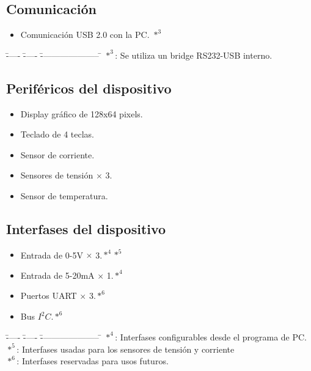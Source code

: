 \documentclass[12pt]{article}
\begin{document}
    \subsection{Comunicación}
      
      \begin{itemize}
	\item Comunicación USB 2.0 con la PC. $*^{3}$
      \end{itemize}
    
      \begin{tabbing}
	\= ----- \= ----- \= --------------------- \= \kill
	\>$*^{3}$: \>Se utiliza un bridge RS232-USB interno. \\
       \end{tabbing}
	
    \subsection{Periféricos del dispositivo}
      \begin{itemize}
	\item Display gráfico de 128x64 pixels.
	\item Teclado de 4 teclas.
	\item Sensor de corriente.
	\item Sensores de tensión $\times$ 3.
	\item Sensor de temperatura.
      \end{itemize}

    \subsection{Interfases del dispositivo}
      \begin{itemize}
	\item Entrada de 0-5V $\times$ 3.$*^{4}*^{5}$
	\item Entrada de 5-20mA $\times$ 1.$*^{4}$
	\item Puertos UART $\times$ 3.$*^{6}$
	\item Bus $ I^{2}C $.$*^{6}$
      \end{itemize}

      \begin{tabbing}
       \= ----- \= ----- \= --------------------- \= \kill
	\> $*^{4}$: \>Interfases configurables desde el programa de PC. \\
	\> $*^{5}$: \>Interfases usadas para los sensores de tensión y corriente \\
	\> $*^{6}$: \>Interfases reservadas para usos futuros. \\
      \end{tabbing}
\end{document}
